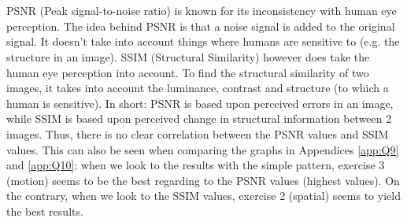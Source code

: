 \section[Is there a clear correlation between the PSNR and SSIM; and does the SSIM better match the perceived quality.]{}
PSNR (Peak signal-to-noise ratio) is known for its inconsistency with human eye perception. The idea behind PSNR is that a noise signal is added to the original signal. It doesn't take into account things where humans are sensitive to (e.g. the structure in an image).
SSIM (Structural Similarity) however does take the human eye perception into account. To find the structural similarity of two images, it takes into account the luminance, contrast and structure (to which a human is sensitive).
\npar
In short: PSNR is based upon perceived errors in an image, while SSIM is based upon perceived change in structural information between 2 images. Thus, there is no clear correlation between the PSNR values and SSIM values. This can also be seen when comparing the graphs in Appendices \ref{app:Q9} and \ref{app:Q10}: when we look to the results with the simple pattern, exercise 3 (motion) seems to be the best regarding to the PSNR values (highest values). On the contrary, when we look to the SSIM values, exercise 2 (spatial) seems to yield the best results.
